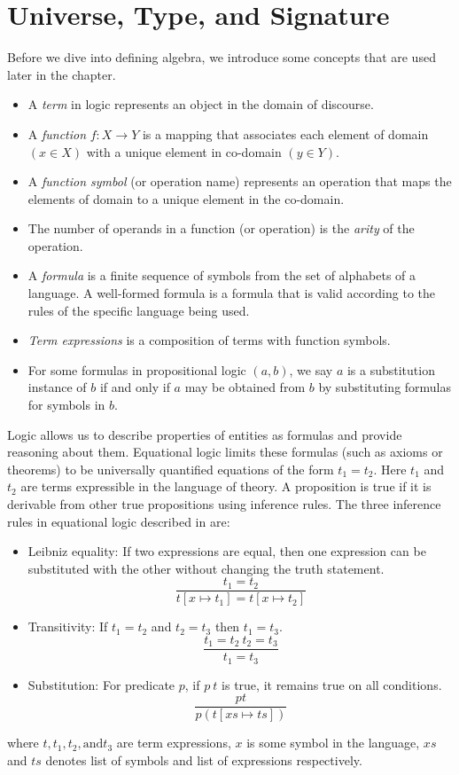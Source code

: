 \section{Universe, Type, and Signature}
Before we dive into defining algebra, we introduce some concepts that are
used later in the chapter.
\begin{itemize}
    \item  A \emph{term} in logic represents an object in the domain of
    discourse.
    \item  A \emph{function} $f: X \rightarrow Y$ is a mapping that associates each
    element of domain $(x \in X)$ with a unique element in co-domain $(y \in Y)$.
    \item  A \emph{function symbol} (or operation name) represents an operation
    that maps the elements of domain to a unique element in the co-domain.
    \item The number of operands in a function (or operation) is the \emph{arity} of
    the operation.
    \item A \emph{formula} is a finite sequence of symbols from the set of alphabets of a
    language. A well-formed formula is a formula that is valid according
    to the rules of the specific language being used.
    \item \emph{Term expressions} is a composition of terms with function symbols.
    \item For some formulas in propositional logic $(a,b)$, we say $a$ is a
    substitution instance of $b$ if and only if $a$ may be obtained from $b$ by
    substituting formulas for symbols in $b$.
\end{itemize}

\label{universe}
Logic allows us to describe properties of entities as formulas and provide
reasoning about them. Equational logic limits these formulas (such as axioms
or theorems) to be universally quantified equations of the form $t_1 = t_2$.
Here $t_1$ and $t_2$ are terms expressible in the language of theory. A
proposition is true if it is derivable from other true propositions using
inference rules. The three inference rules in equational logic described in
\cite{gries2013logical} are:
\begin{itemize}
    \item Leibniz equality: If two expressions are equal, then one expression
    can be substituted with the other without changing the truth statement.
    \[\frac{t_1 = t_2}{t[x \mapsto t_1] = t[x \mapsto t_2]}\]
    \item Transitivity: If $t_1 = t_2$ and $t_2 = t_3$ then $t_1 = t_3$.
    \[{\frac{t_1 = t_2\ t_2 = t_3}{t_1 = t_3}}\]
    \item Substitution: For predicate $p$, if $p\ t$ is true, it remains true on all
    conditions. \[\frac{p t}{p(t[xs \mapsto ts])}\]
\end{itemize}
where $t,t_1,t_2, \text{and} t_3$ are term expressions, $x$ is some symbol in the
language, $xs$ and $ts$ denotes list of symbols and list of expressions
respectively. 

